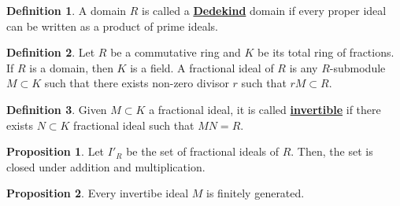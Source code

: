 \documentclass{article}
\theoremstyle{definition}
\theoremstyle{definition}
\theoremstyle{definition}
\newtheorem{proposition}{Proposition}[section]
\theoremstyle{definition}
\theoremstyle{definition}
\newtheorem{definition}{Definition}[section]
\theoremstyle{definition}
\theoremstyle{definition}
\begin{document}
\begin{tcolorbox}[colback=purple!5!white,colframe=purple!75!black]
\begin{definition}
A domain $R$ is called a \underline{\textbf{Dedekind}} domain if every proper ideal can be written as a product of prime ideals.
\end{definition}
\end{tcolorbox}


\begin{tcolorbox}[colback=purple!5!white,colframe=purple!75!black]
\begin{definition}
Let $R$ be a commutative ring and $K$ be its total ring of fractions. If $R$ is a domain, then $K$ is a field. A fractional ideal of $R$ is any $R$-submodule $M\subset K$ such that there exists non-zero divisor $r$ such that $rM\subset R$. 
\end{definition}
\end{tcolorbox}


\begin{tcolorbox}[colback=purple!5!white,colframe=purple!75!black]
\begin{definition}
Given $M\subset K$ a fractional ideal, it is called \underline{\textbf{invertible}} if there exists $N\subset K$ fractional ideal such that $MN=R$.
\end{definition}
\end{tcolorbox}


\begin{tcolorbox}[colback=blue!5!white,colframe=blue!30!white]
\begin{proposition}
Let $I'_R$ be the set of fractional ideals of $R$. Then, the set is closed under addition and multiplication. 
\end{proposition}
\end{tcolorbox}


\begin{tcolorbox}[colback=blue!5!white,colframe=blue!30!white]
\begin{proposition}
Every invertibe ideal $M$ is finitely generated. 
\end{proposition}
\end{tcolorbox}
\end{document}
